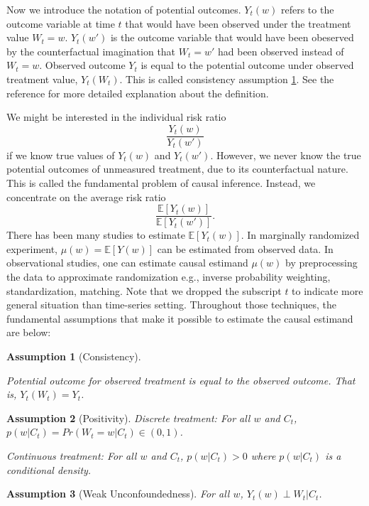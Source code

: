 \documentclass[12pt]{article}
\newtheorem{asm}{Assumption}
\begin{document}
Now we introduce the notation of potential outcomes.
$Y_t(w)$ refers to the outcome variable at time $t$
that would have been observed under the treatment value $W_t = w$.
$Y_t(w')$ is the outcome variable that would have been obeserved by the counterfactual imagination
that $W_t = w'$ had been observed instead of $W_t = w$.
Observed outcome $Y_t$ is equal to the potential outcome under observed treatment value, $Y_t(W_t)$.
This is called consistency assumption \ref{asm:consistency}.
See the reference\cite{whatif2020} for more detailed explanation about the definition.

We might be interested in the individual risk ratio
\[
	\frac{Y_t(w)}{Y_t(w')}
\]
if we know true values of $Y_t(w)$ and $Y_t(w')$.
However, we never know the true potential outcomes of unmeasured treatment, 
due to its counterfactual nature.
This is called the fundamental problem of causal inference\cite{holland1986}.
Instead, we concentrate on the average risk ratio
\[
	\frac{\mathbb{E}\left[ Y_t(w) \right]}{\mathbb{E}\left[ Y_t(w') \right]}.
\]
There has been many studies to estimate $\mathbb{E}[Y_t(w)]$.
In marginally randomized experiment, 
$\mu(w) = \mathbb{E}[Y(w)]$ can be estimated from observed data\cite{rubin1974}.
In observational studies, 
one can estimate causal estimand $\mu(w)$ by preprocessing the data to approximate randomization 
e.g., inverse probability weighting, standardization, matching\cite{rosenbaum1983}.
Note that we dropped the subscript $t$ to indicate more general situation than time-series setting.
Throughout those techniques, 
the fundamental assumptions that make it possible to estimate the causal estimand are below:

\begin{asm}[Consistency]\label{asm:consistency}\hfill

	Potential outcome for observed treatment is equal to the observed outcome.
	That is, $Y_t(W_t) = Y_t$.
\end{asm}

\begin{asm}[Positivity]\hfill

	Discrete treatment:
	For all $w$ and $C_t$, $p(w\lvert C_t) = Pr\left ( W_t = w \lvert C_t\right ) \in (0, 1)$.

	Continuous treatment:
	For all $w$ and $C_t$, $p(w\lvert C_t) > 0$ where $p(w\lvert C_t)$ is a conditional density.
\end{asm}


\begin{asm}[Weak Unconfoundedness] \hfill

	For all $w$, $Y_{t}(w) \perp W_t \lvert C_t$.
\end{asm}
\end{document}
